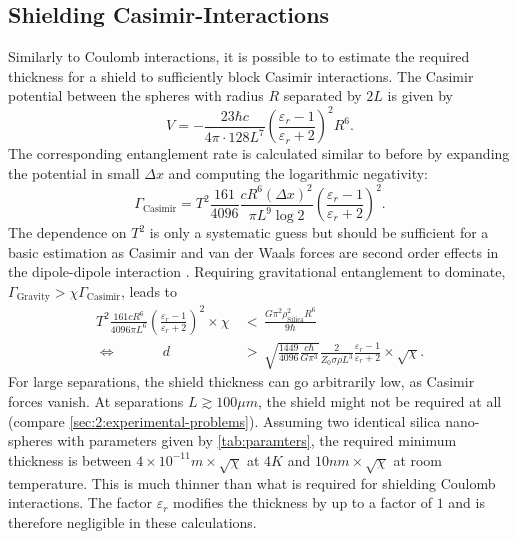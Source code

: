 \subsection{Shielding Casimir-Interactions}
Similarly to Coulomb interactions, it is possible to to estimate the required thickness for a shield to sufficiently block Casimir interactions.
The Casimir potential between the spheres with radius $R$ separated by $2L$ is given by \cite{Emig_2007}
\begin{equation}
  V = -\frac{23 \hbar c}{4\pi \cdot 128 L^7} \left( \frac{\varepsilon_r - 1}{\varepsilon_r + 2} \right)^2 R^6 .
\end{equation}
The corresponding entanglement rate is calculated similar to before by expanding the potential in small $\Delta x$ and computing the logarithmic negativity:
\begin{equation}
  \Gamma_\mathrm{Casimir} = T^2 \frac{161}{4096} \frac{c R^6 (\Delta x)^2}{\pi L^9 \log 2}\left( \frac{\varepsilon_r - 1}{\varepsilon_r + 2}\right)^2 .
\end{equation}
The dependence on $T^2$ is only a systematic guess but should be sufficient for a basic estimation as Casimir and van der Waals forces are second order effects in the dipole-dipole interaction \cite{Bordag_2001}.
Requiring gravitational entanglement to dominate, $\Gamma_\mathrm{Gravity} > \chi \Gamma_\mathrm{Casimir}$, leads to
\begin{align}
  T^2 \frac{161 c R^6}{4096 \pi L^6} \left( \frac{\varepsilon_r - 1}{\varepsilon_r + 2}\right)^2 \times \chi \, &< \, \frac{G \pi^2 \rho_\mathrm{Silica}^2 R^6}{9\hbar} \\
  \Longleftrightarrow \quad\quad\quad\  d \, &> \, \sqrt{\frac{1449}{4096} \frac{c \hbar}{G \pi^3}} \frac{2}{Z_0 \sigma \rho L^3} \frac{\varepsilon_r - 1}{\varepsilon_r + 2} \times \sqrt{\chi} .
\end{align}
For large separations, the shield thickness can go arbitrarily low, as Casimir forces vanish. At separations $L\gtrsim 100\si{\mu m}$, the shield might not be required at all (compare \cref{sec:2:experimental-problems}).
Assuming two identical silica nano-spheres with parameters given by \cref{tab:paramters}, the required minimum thickness is between $4\times 10^{-11}\si{m} \times \sqrt{\chi}$ at $4\si{K}$ and $10 \si{nm}\times \sqrt{\chi}$ at room temperature.
This is much thinner than what is required for shielding Coulomb interactions.
The factor $\varepsilon_r$ modifies the thickness by up to a factor of $1$ and is therefore negligible in these calculations.

